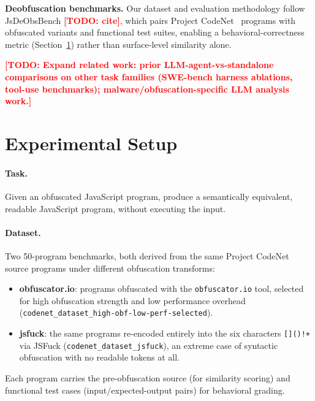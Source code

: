 \documentclass[11pt]{article}
\newcommand{\todo}[1]{\textcolor{red}{\textbf{[TODO: #1]}}}
\begin{document}
\textbf{Deobfuscation benchmarks.} Our dataset and evaluation methodology
follow JsDeObsBench \todo{cite}, which pairs Project CodeNet~\cite{puri2021codenet}
programs with obfuscated variants and functional test suites, enabling a
behavioral-correctness metric (Section~\ref{sec:setup}) rather than
surface-level similarity alone.

\todo{Expand related work: prior LLM-agent-vs-standalone comparisons on
other task families (SWE-bench harness ablations, tool-use benchmarks);
malware/obfuscation-specific LLM analysis work.}

\section{Experimental Setup}
\label{sec:setup}

\paragraph{Task.} Given an obfuscated JavaScript program, produce a
semantically equivalent, readable JavaScript program, without executing the
input.

\paragraph{Dataset.} Two 50-program benchmarks, both derived from the same
Project CodeNet~\cite{puri2021codenet} source programs under different
obfuscation transforms:
\begin{itemize}
  \item \textbf{obfuscator.io}: programs obfuscated with the
    \texttt{obfuscator.io} tool, selected for high obfuscation strength and
    low performance overhead (\texttt{codenet\_dataset\_high-obf-low-perf-selected}).
  \item \textbf{jsfuck}: the same programs re-encoded entirely into the six
    characters \texttt{[]()!+} via JSFuck (\texttt{codenet\_dataset\_jsfuck}),
    an extreme case of syntactic obfuscation with no readable tokens at all.
\end{itemize}
Each program carries the pre-obfuscation source (for similarity scoring)
and functional test cases (input/expected-output pairs) for behavioral
grading.
\end{document}
